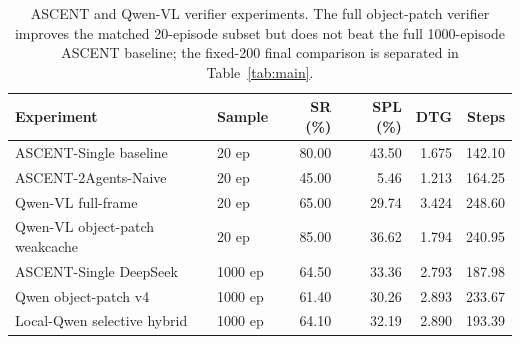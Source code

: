 \documentclass[10pt,twocolumn,letterpaper]{article}
\begin{document}
\begin{table}[t]
\centering
\small
\caption{ASCENT and Qwen-VL verifier experiments. The full object-patch verifier improves the matched 20-episode subset but does not beat the full 1000-episode ASCENT baseline; the fixed-200 final comparison is separated in Table~\ref{tab:main}.}
\label{tab:ascent}
\begin{tabular}{llrrrr}
\toprule
Experiment & Sample & SR (\%) & SPL (\%) & DTG & Steps \\
\midrule
ASCENT-Single baseline & 20 ep & 80.00 & 43.50 & 1.675 & 142.10 \\
ASCENT-2Agents-Naive & 20 ep & 45.00 & 5.46 & 1.213 & 164.25 \\
Qwen-VL full-frame & 20 ep & 65.00 & 29.74 & 3.424 & 248.60 \\
Qwen-VL object-patch weakcache & 20 ep & 85.00 & 36.62 & 1.794 & 240.95 \\
ASCENT-Single DeepSeek & 1000 ep & 64.50 & 33.36 & 2.793 & 187.98 \\
Qwen object-patch v4 & 1000 ep & 61.40 & 30.26 & 2.893 & 233.67 \\
Local-Qwen selective hybrid & 1000 ep & 64.10 & 32.19 & 2.890 & 193.39 \\
\bottomrule
\end{tabular}
\end{table}
\end{document}
